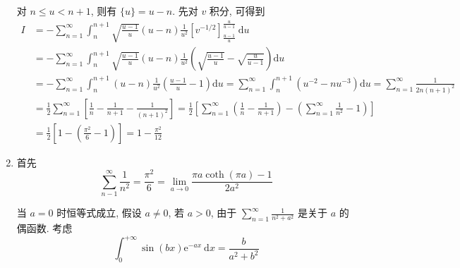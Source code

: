 \begin{solution}
\begin{enumerate}
              对 $n \leq u<n+1$, 则有 $\{u\}=u-n$. 先对 $v$ 积分, 可得到
              $$
                  \begin{aligned}
                      I & =-\sum_{n=1}^{\infty} \int_n^{n+1} \sqrt{\frac{u-1}{u}}(u-n) \frac{1}{u^2}\left[v^{-1 / 2}\right]_{\frac{u-1}{u}}^{\frac{u}{u-1}} \mathrm{~d} u                                                                             \\
                        & =-\sum_{n=1}^{\infty} \int_n^{n+1} \sqrt{\frac{u-1}{u}}(u-n) \frac{1}{u^2}\left(\sqrt{\frac{u-1}{u}}-\sqrt{\frac{u}{u-1}}\right) \mathrm{d} u                                                                               \\
                        & =-\sum_{n=1}^{\infty} \int_n^{n+1}(u-n) \frac{1}{u^2}\left(\frac{u-1}{u}-1\right) \mathrm{d} u=\sum_{n=1}^{\infty} \int_n^{n+1}\left(u^{-2}-n u^{-3}\right) \mathrm{d} u=\sum_{n=1}^{\infty} \frac{1}{2 n(n+1)^2}           \\
                        & =\frac{1}{2} \sum_{n=1}^{\infty}\left[\frac{1}{n}-\frac{1}{n+1}-\frac{1}{(n+1)^2}\right]=\frac{1}{2}\left[\sum_{n=1}^{\infty}\left(\frac{1}{n}-\frac{1}{n+1}\right)-\left(\sum_{n=1}^{\infty} \frac{1}{n^2}-1\right)\right] \\
                        & =\frac{1}{2}\left[1-\left(\frac{\pi^2}{6}-1\right)\right]=1-\frac{\pi^2}{12}
                  \end{aligned}
              $$
        \item 首先
              $$
                  \sum_{n-1}^{\infty} \frac{1}{n^2}=\frac{\pi^2}{6}=\lim _{a \rightarrow 0} \frac{\pi a \operatorname{coth}(\pi a)-1}{2 a^2}
              $$

              当 $a=0$ 时恒等式成立, 假设 $a \neq 0$, 若 $a>0$, 由于 $\sum_{n=1}^{\infty} \frac{1}{n^2+a^2}$ 是关于 $a$ 的偶函数.
              考虑
              $$
                  \int_0^{+\infty} \sin (b x) \mathrm{e}^{-a x} \mathrm{~d} x=\frac{b}{a^2+b^2}
              $$


\end{enumerate}
\end{solution}
